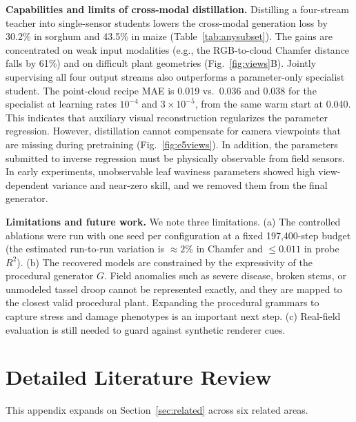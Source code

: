 \documentclass[10pt,twocolumn,letterpaper]{article}
\begin{document}
\noindent\textbf{Capabilities and limits of cross-modal distillation.}
Distilling a four-stream teacher into single-sensor students lowers the cross-modal generation loss by 30.2\% in sorghum and 43.5\% in maize (Table~\ref{tab:anysubset}). The gains are concentrated on weak input modalities (e.g., the RGB-to-cloud Chamfer distance falls by 61\%) and on difficult plant geometries (Fig.~\ref{fig:views}B). Jointly supervising all four output streams also outperforms a parameter-only specialist student. The point-cloud recipe MAE is 0.019 vs.\ 0.036 and 0.038 for the specialist at learning rates $10^{-4}$ and $3 \times 10^{-5}$, from the same warm start at 0.040. This indicates that auxiliary visual reconstruction regularizes the parameter regression. However, distillation cannot compensate for camera viewpoints that are missing during pretraining (Fig.~\ref{fig:e5views}). In addition, the parameters submitted to inverse regression must be physically observable from field sensors. In early experiments, unobservable leaf waviness parameters showed high view-dependent variance and near-zero skill, and we removed them from the final generator.

\noindent\textbf{Limitations and future work.}
We note three limitations. (a) The controlled ablations were run with one seed per configuration at a fixed 197{,}400-step budget (the estimated run-to-run variation is $\approx 2\%$ in Chamfer and $\le 0.011$ in probe $R^2$). (b) The recovered models are constrained by the expressivity of the procedural generator $G$. Field anomalies such as severe disease, broken stems, or unmodeled tassel droop cannot be represented exactly, and they are mapped to the closest valid procedural plant. Expanding the procedural grammars to capture stress and damage phenotypes is an important next step. (c) Real-field evaluation is still needed to guard against synthetic renderer cues.

\section{Detailed Literature Review}
\label{app:litreview}

This appendix expands on Section~\ref{sec:related} across six related areas.
\end{document}
